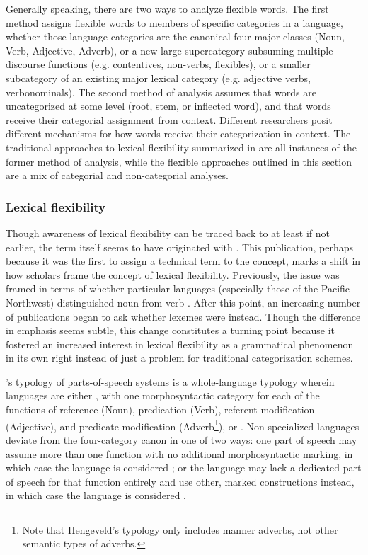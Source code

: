 Generally speaking, there are two ways to analyze flexible words. The first method assigns flexible words to members of specific categories in a language, whether those language-categories are the canonical four major classes (Noun, Verb, Adjective, Adverb), or a new large supercategory subsuming multiple discourse functions (e.g. contentives, non-verbs, flexibles), or a smaller subcategory of an existing major lexical category (e.g. adjective verbs, verbonominals). The second method of analysis assumes that words are uncategorized at some level (root, stem, or inflected word), and that words receive their categorial assignment from context. Different researchers posit different mechanisms for how words receive their categorization in context. The traditional approaches to lexical flexibility summarized in  are all instances of the former method of analysis, while the flexible approaches outlined in this section are a mix of categorial and non-categorial analyses.

\subsubsection{Lexical flexibility}
\label{sec:2.3.1.1}

Though awareness of lexical flexibility can be traced back to at least \textcite[174--177]{Gallatin1836} if not earlier, the term  itself seems to have originated with \textcite[Ch.~4]{Hengeveld1992}. This publication, perhaps because it was the first to assign a technical term to the concept, marks a shift in how scholars frame the concept of lexical flexibility. Previously, the issue was framed in terms of whether particular languages (especially those of the Pacific Northwest) distinguished noun from verb \parencites{Kuipers1968}{Jacobsen1979}{Hebert1983}{Kinkade1983}{EijkHess1986}{JelinekDemers1994}. After this point, an increasing number of publications began to ask whether lexemes were  instead. Though the difference in emphasis seems subtle, this change constitutes a turning point because it fostered an increased interest in lexical flexibility as a grammatical phenomenon in its own right instead of just a problem for traditional categorization schemes.

\citeauthor{Hengeveld1992}'s \citeyear[Ch.~4]{Hengeveld1992} typology of parts-of-speech systems is a whole-language typology wherein languages are either , with one morphosyntactic category for each of the functions of reference (Noun), predication (Verb), referent modification (Adjective), and predicate modification (Adverb\footnote{Note that Hengeveld's typology only includes manner adverbs, not other semantic types of adverbs.}), or . Non-specialized languages deviate from the four-category canon in one of two ways: one part of speech may assume more than one function with no additional morphosyntactic marking, in which case the language is considered ; or the language may lack a dedicated part of speech for that function entirely and use other, marked constructions instead, in which case the language is considered .

